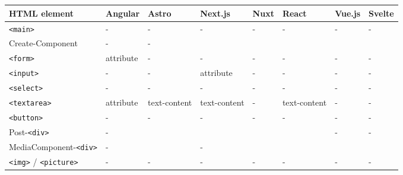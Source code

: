 \documentclass[a4paper, 12pt]{article}
\makeatletter
\renewcommand\listoftables{%
  \section{\listtablename}%
  \@mkboth{\MakeUppercase\listtablename}{\MakeUppercase\listtablename}%
  \@starttoc{lot}%
}
\makeatother
\begin{document}
\listoftables


\begin{table}[!ht]
  \centering
  \begin{adjustbox}{angle=90}
    \begin{tabular}{|l|l|l|l|l|l|l|l|}
      \hline
      \textbf{HTML element}           & \textbf{Angular}  & \textbf{Astro}  & \textbf{Next.js}  & \textbf{Nuxt} & \textbf{React}  & \textbf{Vue.js} & \textbf{Svelte} \\ \hline
      \verb|<main>|                   & -                 & -               & -                 & -             & -               & -               & -               \\ \hline
      Create-Component                & -                 & -               & ~                 & ~             & ~               & ~               & ~               \\ \hline
      \verb|<form>|                   & attribute         & -               & -                 & -             & -               & -               & -               \\ \hline
      \verb|<input>|                  & -                 & -               & attribute         & -             & -               & -               & -               \\ \hline
      \verb|<select>|                 & -                 & -               & -                 & -             & -               & -               & -               \\ \hline
      \verb|<textarea>|               & attribute         & text-content    & text-content      & -             & text-content    & -               & -               \\ \hline
      \verb|<button>|                 & -                 & -               & -                 & -             & -               & -               & -               \\ \hline
      Post-\verb|<div>|               & -                 & ~               & ~                 & ~             & ~               & -               & -               \\ \hline
      MediaComponent-\verb|<div>|     & -                 & ~               & -                 & ~             & ~               & ~               & ~               \\ \hline
      \verb|<img>| / \verb|<picture>| & -                 & -               & -                 & -             & -               & -               & -               \\ \hline

\end{tabular}
\end{adjustbox}
\end{table}
\end{document}
